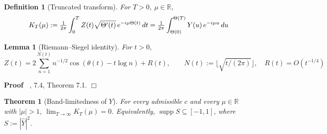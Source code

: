 \documentclass{article}
\newcommand{\assign}{:=}
\newcommand{\tmop}[1]{\ensuremath{\operatorname{#1}}}
\newenvironment{proof}{\noindent\textbf{Proof\ }}{\hspace*{\fill}$\Box$\medskip}
\newtheorem{definition}{Definition}
\newtheorem{lemma}{Lemma}
\newtheorem{theorem}{Theorem}
\newcommand{\supp}{\tmop{supp}}
\begin{document}
\begin{definition}
  [Truncated transform]\label{def:KT} For $T > 0$, $\mu \in \mathbb{R}$,
  \begin{equation}
    K_T (\mu) \assign \tfrac{1}{2 \pi} \int_0^T Z (t) \sqrt{\Theta' (t)} 
    \hspace{0.17em} e^{- i \mu \Theta (t)}  \hspace{0.17em} dt = \tfrac{1}{2
    \pi} \int_{\Theta (0)}^{\Theta (T)} Y (u)  \hspace{0.17em} e^{- i \mu u} 
    \hspace{0.17em} du
  \end{equation}
\end{definition}

\begin{lemma}
  [Riemann--Siegel identity]\label{lem:RS} For $t > 0$,
  \[ Z (t) = 2 \sum_{n = 1}^{N (t)} n^{- 1 / 2} \cos (\theta (t) - t \log n) +
     R (t), \qquad N (t) \assign \lfloor \sqrt{t / (2 \pi)} \rfloor, \quad R
     (t) = O (t^{- 1 / 4}) \]
\end{lemma}

\begin{proof}
  {\cite{Edwards}}, {\textsection}7.4, Theorem 7.1.
\end{proof}

\begin{theorem}
  [Band-limitedness of $Y$]\label{thm:bandlim} For every admissible $c$ and
  every $\mu \in \mathbb{R}$ with $| \mu | > 1$, $\lim_{T \to \infty} K_T
  (\mu) = 0$. Equivalently, $\supp S \subseteq [- 1, 1]$, where $S \assign |
  \hat{Y} |^2$.
\end{theorem}
\end{document}
